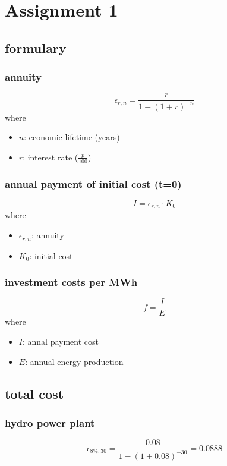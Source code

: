 \documentclass{article}
\begin{document}
\section{Assignment 1}
\subsection{formulary}
\subsubsection{annuity}
\begin{equation}
\epsilon_{r,n}=\frac{r}{1-(1+r)^{-n}}
\end{equation}
where
\begin{itemize}
\item $n$: economic lifetime (years)
\item $r$: interest rate ($\frac{p}{100}$)
\end{itemize}
\subsubsection{annual payment of initial cost (t=0)}
\begin{equation}
I=\epsilon_{r,n}\cdot K_0
\end{equation}
where
\begin{itemize}
\item $\epsilon_{r,n}$: annuity
\item $K_0$: initial cost
\end{itemize}
\subsubsection{investment costs per MWh}
\begin{equation}
f=\frac{I}{E}
\end{equation}
where
\begin{itemize}
\item $I$: annal payment cost
\item $E$: annual energy production
\end{itemize}
\subsection{total cost}
\subsubsection{hydro power plant}
$$\epsilon_{8\%,30}=\frac{0.08}{1-(1+0.08)^{-30}}=0.0888$$
\end{document}
